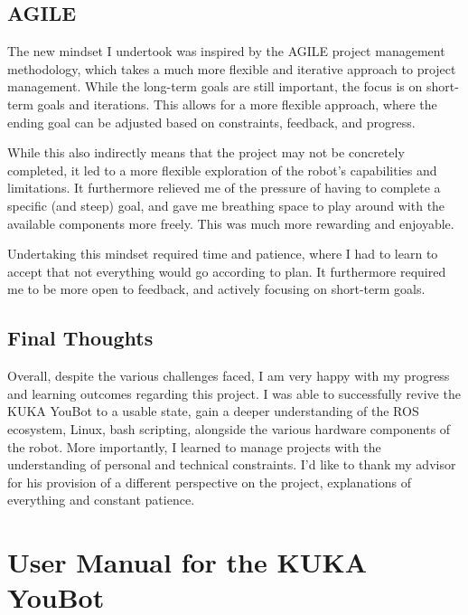 \documentclass[a4paper, 12pt]{article}
\begin{document}
    \subsection{AGILE}

    The new mindset I undertook was inspired by the AGILE project management methodology, which takes a much more flexible and iterative approach to project management. While the long-term goals are still important, the focus is on short-term goals and iterations. This allows for a more flexible approach, where the ending goal can be adjusted based on constraints, feedback, and progress. 

    While this also indirectly means that the project may not be concretely completed, it led to a more flexible exploration of the robot's capabilities and limitations. It furthermore relieved me of the pressure of having to complete a specific (and steep) goal, and gave me breathing space to play around with the available components more freely. This was much more rewarding and enjoyable.

    Undertaking this mindset required time and patience, where I had to learn to accept that not everything would go according to plan. It furthermore required me to be more open to feedback, and actively focusing on short-term goals. 

    \subsection{Final Thoughts}

    Overall, despite the various challenges faced, I am very happy with my progress and learning outcomes regarding this project. I was able to successfully revive the KUKA YouBot to a usable state, gain a deeper understanding of the ROS ecosystem, Linux, bash scripting, alongside the various hardware components of the robot. More importantly, I learned to manage projects with the understanding of personal and technical constraints. I'd like to thank my advisor for his provision of a different perspective on the project, explanations of everything and constant patience.  


    \newpage

    \nocite{*}
    \printbibliography

    \newpage

    \appendix


    \section{User Manual for the KUKA YouBot}
\end{document}
